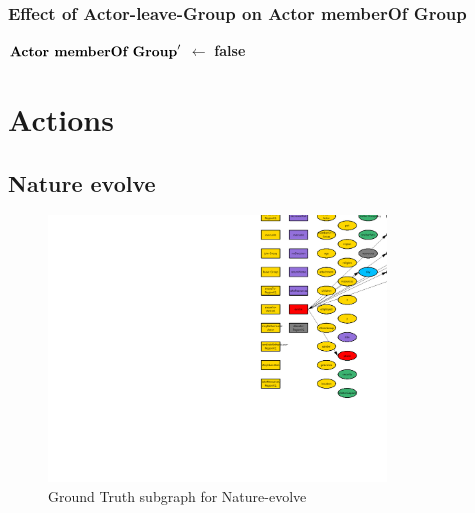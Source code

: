 \documentclass{article}%
\begin{document}
%
\subsubsection{Effect of Actor{-}leave{-}Group on Actor memberOf Group}%
\label{ssubsec:Effect of Actor{-}leave{-}Group on Actor memberOf Group}%
\begin{flushleft}%
$\mbox{\textbf{Actor memberOf Group}} '$%
$\leftarrow$%
\textbf{false}%
\end{flushleft}

%
\section{Actions}%
\label{sec:Actions}%
\subsection{Nature evolve}%
\label{subsec:Nature evolve}%


\begin{figure}[ht]%
\centering%
\includegraphics[width=0.8\textwidth]{images/Nature-evolve.png}%
\caption{Ground Truth subgraph for Nature{-}evolve}%
\end{figure}

%
\end{document}
